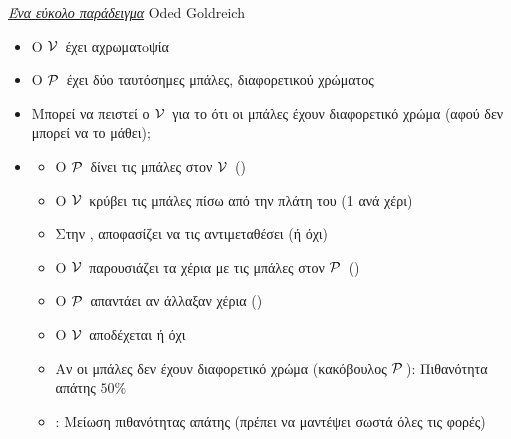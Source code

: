 \documentclass[10pt,handout]{beamer}
\begin{document}
\begin{frame}{\textit{\href{http://mathoverflow.net/questions/22624/example-of-a-good-zero-knowledge-proof}{Ένα εύκολο παράδειγμα}} Oded Goldreich}
\begin{small}
\begin{itemize}
\setlength \itemsep{0.01pt}
\item Ο $\mathcal{V}\,$ έχει αχρωματoψία
\pause
\item O $\mathcal{P}\,$ έχει δύο ταυτόσημες μπάλες, διαφορετικού χρώματος
\pause
\item Μπορεί να πειστεί ο $\mathcal{V}\,$ για το ότι οι μπάλες έχουν διαφορετικό χρώμα (\alert{αφού δεν μπορεί να το μάθει});
\pause
\item {}
\begin{itemize}
\item Ο $\mathcal{P}\,$ δίνει τις μπάλες στον $\mathcal{V}\,$ ()
\item Ο $\mathcal{V}\,$ κρύβει τις μπάλες πίσω από την πλάτη του (1 ανά χέρι)
\pause
\item Στην , αποφασίζει να τις αντιμεταθέσει (ή όχι)
\pause
\item O $\mathcal{V}\,$ παρουσιάζει τα χέρια με τις μπάλες στον $\mathcal{P}\,$ ()
\pause
\item Ο $\mathcal{P}\,$ απαντάει αν άλλαξαν χέρια ()
\pause
\item Ο $\mathcal{V}\,$ αποδέχεται ή όχι
\pause
\item Αν οι μπάλες \alert{δεν} έχουν διαφορετικό χρώμα (κακόβουλος $\mathcal{P}\,$): Πιθανότητα απάτης $50\%$
\pause
\item {}: Μείωση πιθανότητας απάτης (πρέπει να μαντέψει σωστά όλες τις φορές)
\end{itemize}
\end{itemize}
\end{small}
\end{frame}
\end{document}
